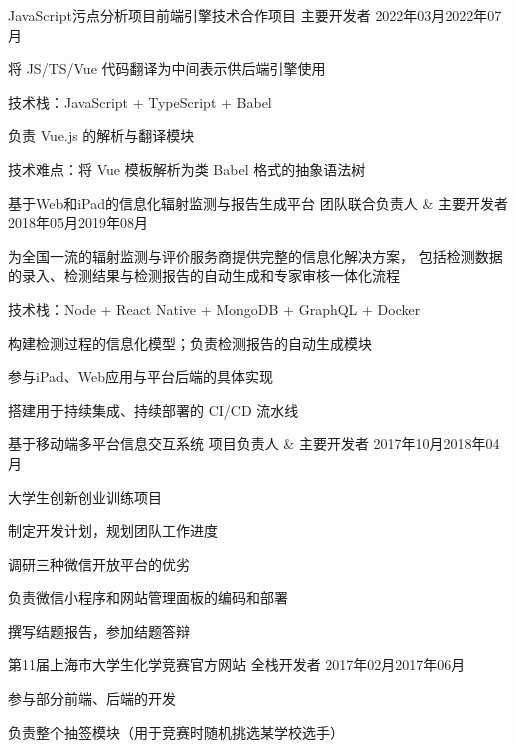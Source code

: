 
\begin{projitem}
    {JavaScript污点分析项目前端引擎技术合作项目}
    {主要开发者}
    {2022年03月}{2022年07月}
    \item 将 JS/TS/Vue 代码翻译为中间表示供后端引擎使用
    \item 技术栈：JavaScript + TypeScript + Babel
    \item 负责 Vue.js 的解析与翻译模块
    \item 技术难点：将 Vue 模板解析为类 Babel 格式的抽象语法树
\end{projitem}



\begin{projitem}
    {基于Web和iPad的信息化辐射监测与报告生成平台}
    {团队联合负责人 \& 主要开发者}
    {2018年05月}{2019年08月}
    \item 为全国一流的辐射监测与评价服务商提供完整的信息化解决方案，
        包括检测数据的录入、检测结果与检测报告的自动生成和专家审核一体化流程
    \item 技术栈：Node + React Native + MongoDB + GraphQL + Docker
    \item 构建检测过程的信息化模型；负责检测报告的自动生成模块
    \item 参与iPad、Web应用与平台后端的具体实现
    \item 搭建用于持续集成、持续部署的 CI/CD 流水线
\end{projitem}

\begin{projitem}
    {基于移动端多平台信息交互系统}
    {项目负责人 \& 主要开发者}
    {2017年10月}{2018年04月}
    \item 大学生创新创业训练项目
    \item 制定开发计划，规划团队工作进度
    \item 调研三种微信开放平台的优劣
    \item 负责微信小程序和网站管理面板的编码和部署
    \item 撰写结题报告，参加结题答辩
\end{projitem}

\begin{projitem}
    {第11届上海市大学生化学竞赛官方网站}
    {全栈开发者}
    {2017年02月}{2017年06月}
    \item 参与部分前端、后端的开发
    \item 负责整个抽签模块（用于竞赛时随机挑选某学校选手）
\end{projitem}

\endinput